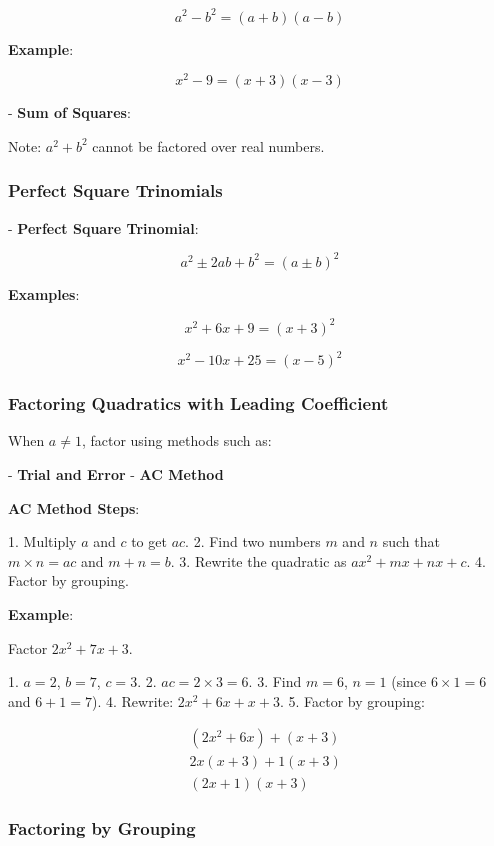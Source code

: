 \documentclass{article}
\begin{document}
\begin{multicols}{2}
\[
a^2 - b^2 = (a + b)(a - b)
\]

\textbf{Example}:

\[
x^2 - 9 = (x + 3)(x - 3)
\]

- \textbf{Sum of Squares}:

Note: \( a^2 + b^2 \) cannot be factored over real numbers.

\subsubsection*{Perfect Square Trinomials}

- \textbf{Perfect Square Trinomial}:

\[
a^2 \pm 2ab + b^2 = (a \pm b)^2
\]

\textbf{Examples}:

\[
x^2 + 6x + 9 = (x + 3)^2
\]

\[
x^2 - 10x + 25 = (x - 5)^2
\]

\subsubsection*{Factoring Quadratics with Leading Coefficient}

When \( a \neq 1 \), factor using methods such as:

- \textbf{Trial and Error}
- \textbf{AC Method}

\textbf{AC Method Steps}:

1. Multiply \( a \) and \( c \) to get \( ac \).
2. Find two numbers \( m \) and \( n \) such that \( m \times n = ac \) and \( m + n = b \).
3. Rewrite the quadratic as \( ax^2 + mx + nx + c \).
4. Factor by grouping.

\textbf{Example}:

Factor \( 2x^2 + 7x + 3 \).

1. \( a = 2 \), \( b = 7 \), \( c = 3 \).
2. \( ac = 2 \times 3 = 6 \).
3. Find \( m = 6 \), \( n = 1 \) (since \( 6 \times 1 = 6 \) and \( 6 + 1 = 7 \)).
4. Rewrite: \( 2x^2 + 6x + x + 3 \).
5. Factor by grouping:

\[
\begin{aligned}
& (2x^2 + 6x) + (x + 3) \\
& 2x(x + 3) + 1(x + 3) \\
& (2x + 1)(x + 3)
\end{aligned}
\]

\subsubsection*{Factoring by Grouping}


\end{multicols}
\end{document}
